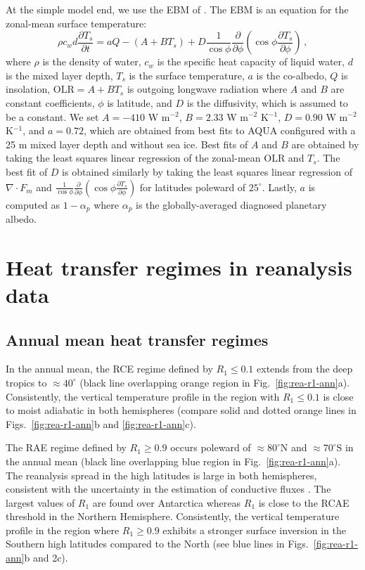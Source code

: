 \documentclass{ametsocV5}
\begin{document}
    At the simple model end, we use the EBM of \cite{rose2017}. The EBM is an equation for the zonal-mean surface temperature:
    \begin{equation}
      \rho c_w d \frac{\partial T_s}{\partial t} = aQ - (A+BT_s)  + D \frac{1}{\cos\phi}\frac{\partial}{\partial \phi}\left( \cos\phi \frac{\partial T_s}{\partial \phi} \right)\, ,
    \end{equation}
    where $\rho$ is the density of water, $c_w$ is the specific heat capacity of liquid water, $d$ is the mixed layer depth, $T_s$ is the surface temperature, $a$ is the co-albedo, $Q$ is insolation, $\mathrm{OLR}=A+BT_s$ is outgoing longwave radiation where $A$ and $B$ are constant coefficients, $\phi$ is latitude, and $D$ is the diffusivity, which is assumed to be a constant. We set $A=-410$ W m$^{-2}$, $B=2.33$ W m$^{-2}$ K$^{-1}$, $D=0.90$ W m$^{-2}$ K$^{-1}$, and $a=0.72$, which are obtained from best fits to AQUA configured with a 25 m mixed layer depth and without sea ice. Best fits of $A$ and $B$ are obtained by taking the least squares linear regression of the zonal-mean $\mathrm{OLR}$ and $T_s$. The best fit of $D$ is obtained similarly by taking the least squares linear regression of $\nabla\cdot F_m$ and $\frac{1}{\cos\phi}\frac{\partial}{\partial \phi} \left( \cos\phi \frac{\partial T_s}{\partial \phi} \right)$ for latitudes poleward of $25^\circ$. Lastly, $a$ is computed as $1-\alpha_p$ where $\alpha_p$ is the globally-averaged diagnosed planetary albedo.

\section{Heat transfer regimes in reanalysis data} \label{sec:diagnostics}

    \subsection{Annual mean heat transfer regimes}

    In the annual mean, the RCE regime defined by $R_1 \le 0.1$ extends from the deep tropics to $\approx 40^\circ$ (black line overlapping orange region in Fig.~\ref{fig:rea-r1-ann}a). Consistently, the vertical temperature profile in the region with $R_1 \le 0.1$ is close to moist adiabatic in both hemispheres (compare solid and dotted orange lines in Figs.~\ref{fig:rea-r1-ann}b and \ref{fig:rea-r1-ann}c).

    The RAE regime defined by $R_1 \ge 0.9$ occurs poleward of $\approx 80^\circ$N and $\approx 70^\circ$S in the annual mean (black line overlapping blue region in Fig.~\ref{fig:rea-r1-ann}a). The reanalysis spread in the high latitudes is large in both hemispheres, consistent with the uncertainty in the estimation of conductive fluxes \citep{tastula2013,graham2019}. The largest values of $R_1$ are found over Antarctica whereas $R_1$ is close to the RCAE threshold in the Northern Hemisphere. Consistently, the vertical temperature profile in the region where $R_1 \ge 0.9$ exhibits a stronger surface inversion in the Southern high latitudes compared to the North (see blue lines in Figs.~\ref{fig:rea-r1-ann}b and 2c).
\end{document}
